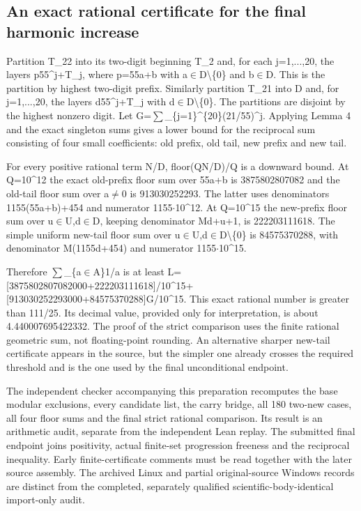\documentclass[11pt,a4paper]{article}
\begin{document}
\subsection{An exact rational certificate for the final harmonic increase}
Partition T\_22 into its two-digit beginning T\_2 and, for each j=1,...,20, the layers p55\textasciicircum{}j+T\_j, where p=55a+b with a\ensuremath{\in}D\textbackslash{}\{0\} and b\ensuremath{\in}D. This is the partition by highest two-digit prefix. Similarly partition T\_21 into D and, for j=1,...,20, the layers d55\textasciicircum{}j+T\_j with d\ensuremath{\in}D\textbackslash{}\{0\}. The partitions are disjoint by the highest nonzero digit. Let G=\ensuremath{\sum}\_\{j=1\}\textasciicircum{}\{20\}(21/55)\textasciicircum{}j. Applying Lemma 4 and the exact singleton sums gives a lower bound for the reciprocal sum consisting of four small coefficients: old prefix, old tail, new prefix and new tail.

For every positive rational term N/D, floor(QN/D)/Q is a downward bound. At Q=10\textasciicircum{}12 the exact old-prefix floor sum over 55a+b is 3875802807082 and the old-tail floor sum over a\ensuremath{\neq}0 is 913030252293. The latter uses denominators 1155(55a+b)+454 and numerator 1155\ensuremath{\cdot}10\textasciicircum{}12. At Q=10\textasciicircum{}15 the new-prefix floor sum over u\ensuremath{\in}U,d\ensuremath{\in}D, keeping denominator Md+u+1, is 222203111618. The simple uniform new-tail floor sum over u\ensuremath{\in}U,d\ensuremath{\in}D\textbackslash{}\{0\} is 84575370288, with denominator M(1155d+454) and numerator 1155\ensuremath{\cdot}10\textasciicircum{}15.

Therefore \ensuremath{\sum}\_\{a\ensuremath{\in}A\}1/a is at least L=[3875802807082000+222203111618]/10\textasciicircum{}15+[913030252293000+84575370288]G/10\textasciicircum{}15. This exact rational number is greater than 111/25. Its decimal value, provided only for interpretation, is about 4.440007695422332. The proof of the strict comparison uses the finite rational geometric sum, not floating-point rounding. An alternative sharper new-tail certificate appears in the source, but the simpler one already crosses the required threshold and is the one used by the final unconditional endpoint.

The independent checker accompanying this preparation recomputes the base modular exclusions, every candidate list, the carry bridge, all 180 two-new cases, all four floor sums and the final strict rational comparison. Its result is an arithmetic audit, separate from the independent Lean replay. The submitted final endpoint joins positivity, actual finite-set progression freeness and the reciprocal inequality. Early finite-certificate comments must be read together with the later source assembly. The archived Linux and partial original-source Windows records are distinct from the completed, separately qualified scientific-body-identical import-only audit.
\end{document}
